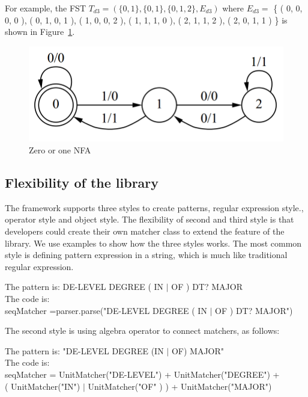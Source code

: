 For example, the FST $T_{d3} = \left(     \{ 0, 1 \} ,  \{ 0, 1 \} , \{ 0, 1 , 2 \} ,  E_{d3} \right ) $ where $E_{d3} = $ \{ ( 0, 0, 0, 0 ),   ( 0, 1, 0, 1 ), ( 1, 0, 0, 2 ), ( 1, 1, 1, 0 ), ( 2, 1, 1, 2 ), ( 2, 0, 1, 1 ) \}  is shown in Figure~\ref{fig:fst}.


\begin{figure}[htbp]
  \centering
  \includegraphics[scale=0.5]{images/fst.png}
  \caption{Zero or one NFA}
  \label{fig:fst}
\end{figure}


\subsection{Flexibility of the library}
The framework supports three styles to create patterns, regular expression style., operator style and  object style. The flexibility of second and third style is that developers could create their own matcher class to extend the feature of the library. We use examples to show how the three styles works. The most common style is defining pattern expression in a string, which is much like traditional regular expression.

\begin{framed}
\small
\noindent
The pattern is:  DE-LEVEL DEGREE ( IN  $\vert$  OF ) DT? MAJOR \\
The code is: \\
seqMatcher =parser.parse("DE-LEVEL DEGREE ( IN  $\vert$  OF ) DT? MAJOR")

\end{framed}

The second style is using algebra operator to connect matchers, as follows:
\begin{framed}
\small
\noindent
The pattern is:  "DE-LEVEL DEGREE (IN $\vert$ OF) MAJOR" \\
The code is: \\
seqMatcher =  UnitMatcher("DE-LEVEL") +  UnitMatcher("DEGREE") + \\
\hspace{3cm} ( UnitMatcher("IN") $\vert$ UnitMatcher("OF" ) ) + UnitMatcher("MAJOR")

\end{framed}

